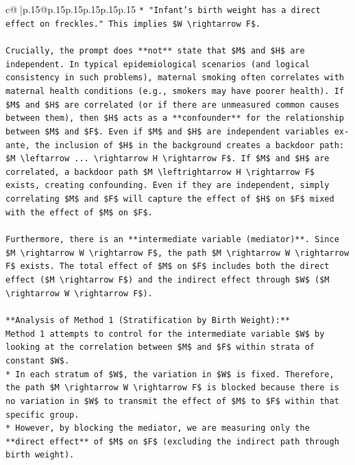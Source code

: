 \documentclass{article}
\begin{document}
{\begin{supertabular}{c@{$\;$}|p{.15\linewidth}@{}p{.15\linewidth}p{.15\linewidth}p{.15\linewidth}p{.15\linewidth}p{.15\linewidth}}
{{{\texttt{*   "Infant's birth weight has a direct effect on freckles." This implies \$W \textbackslash{}rightarrow F\$.} \\
\\ 
\texttt{Crucially, the prompt does **not** state that \$M\$ and \$H\$ are independent. In typical epidemiological scenarios (and logical consistency in such problems), maternal smoking often correlates with maternal health conditions (e.g., smokers may have poorer health). If \$M\$ and \$H\$ are correlated (or if there are unmeasured common causes between them), then \$H\$ acts as a **confounder** for the relationship between \$M\$ and \$F\$. Even if \$M\$ and \$H\$ are independent variables ex{-}ante, the inclusion of \$H\$ in the background creates a backdoor path: \$M \textbackslash{}leftarrow ... \textbackslash{}rightarrow H \textbackslash{}rightarrow F\$. If \$M\$ and \$H\$ are correlated, a backdoor path \$M \textbackslash{}leftrightarrow H \textbackslash{}rightarrow F\$ exists, creating confounding. Even if they are independent, simply correlating \$M\$ and \$F\$ will capture the effect of \$H\$ on \$F\$ mixed with the effect of \$M\$ on \$F\$.} \\
\\ 
\texttt{Furthermore, there is an **intermediate variable (mediator)**. Since \$M \textbackslash{}rightarrow W \textbackslash{}rightarrow F\$, the path \$M \textbackslash{}rightarrow W \textbackslash{}rightarrow F\$ exists. The total effect of \$M\$ on \$F\$ includes both the direct effect (\$M \textbackslash{}rightarrow F\$) and the indirect effect through \$W\$ (\$M \textbackslash{}rightarrow W \textbackslash{}rightarrow F\$).} \\
\\ 
\texttt{**Analysis of Method 1 (Stratification by Birth Weight):**} \\
\texttt{Method 1 attempts to control for the intermediate variable \$W\$ by looking at the correlation between \$M\$ and \$F\$ within strata of constant \$W\$.} \\
\texttt{*   In each stratum of \$W\$, the variation in \$W\$ is fixed. Therefore, the path \$M \textbackslash{}rightarrow W \textbackslash{}rightarrow F\$ is blocked because there is no variation in \$W\$ to transmit the effect of \$M\$ to \$F\$ within that specific group.} \\
\texttt{*   However, by blocking the mediator, we are measuring only the **direct effect** of \$M\$ on \$F\$ (excluding the indirect path through birth weight).} \\
}}}
\end{supertabular}}
\end{document}

